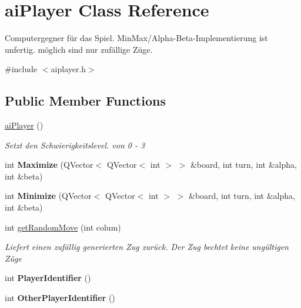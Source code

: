 \hypertarget{classai_player}{\section{ai\-Player Class Reference}
\label{classai_player}
}


Computergegner für das Spiel. Min\-Max/\-Alpha-\/\-Beta-\/\-Implementierung ist unfertig. möglich sind nur zufällige Züge.  




{\ttfamily \#include $<$aiplayer.\-h$>$}

\subsection*{Public Member Functions}
\begin{DoxyCompactItemize}
\item 
\hyperlink{classai_player_a1218587a379bb61445aa5e67a932e262}{ai\-Player} ()
\begin{DoxyCompactList}\small\item\em Setzt den Schwierigkeitslevel. von 0 -\/ 3 \end{DoxyCompactList}\item 
\hypertarget{classai_player_ac815cf510e2c03291e597fa25b732b44}{int {\bfseries Maximize} (Q\-Vector$<$ Q\-Vector$<$ int $>$ $>$ \&board, int turn, int \&alpha, int \&beta)}\label{classai_player_ac815cf510e2c03291e597fa25b732b44}

\item 
\hypertarget{classai_player_a383a7f3c0dd9fedc3bb547658b4da501}{int {\bfseries Minimize} (Q\-Vector$<$ Q\-Vector$<$ int $>$ $>$ \&board, int turn, int \&alpha, int \&beta)}\label{classai_player_a383a7f3c0dd9fedc3bb547658b4da501}

\item 
int \hyperlink{classai_player_a9290bc63d6b1752a44784d8bd75f365b}{get\-Random\-Move} (int colum)
\begin{DoxyCompactList}\small\item\em Liefert einen zufällig generierten Zug zurück. Der Zug bechtet keine ungültigen Züge \end{DoxyCompactList}\item 
\hypertarget{classai_player_a902e0b5e22d6c3ea4bd3e46fdfc2c582}{int {\bfseries Player\-Identifier} ()}\label{classai_player_a902e0b5e22d6c3ea4bd3e46fdfc2c582}

\item 
\hypertarget{classai_player_a030497003f89504920773b788ac91425}{int {\bfseries Other\-Player\-Identifier} ()}\label{classai_player_a030497003f89504920773b788ac91425}


\end{DoxyCompactItemize}
